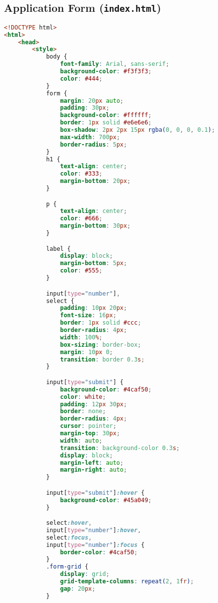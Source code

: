 \subsection{Application Form (\lstinline{index.html})}
\begin{lstlisting}[language=HTML, basicstyle=\footnotesize\ttfamily]
<!DOCTYPE html>
<html>
	<head>
		<style>
			body {
				font-family: Arial, sans-serif;
				background-color: #f3f3f3;
				color: #444;
			}
			form {
				margin: 20px auto;
				padding: 30px;
				background-color: #ffffff;
				border: 1px solid #e6e6e6;
				box-shadow: 2px 2px 15px rgba(0, 0, 0, 0.1);
				max-width: 700px;
				border-radius: 5px;
			}
			h1 {
				text-align: center;
				color: #333;
				margin-bottom: 20px;
			}

			p {
				text-align: center;
				color: #666;
				margin-bottom: 30px;
			}

			label {
				display: block;
				margin-bottom: 5px;
				color: #555;
			}

			input[type="number"],
			select {
				padding: 10px 20px;
				font-size: 16px;
				border: 1px solid #ccc;
				border-radius: 4px;
				width: 100%;
				box-sizing: border-box;
				margin: 10px 0;
				transition: border 0.3s;
			}

			input[type="submit"] {
				background-color: #4caf50;
				color: white;
				padding: 12px 30px;
				border: none;
				border-radius: 4px;
				cursor: pointer;
				margin-top: 30px;
				width: auto;
				transition: background-color 0.3s;
				display: block;
				margin-left: auto;
				margin-right: auto;
			}

			input[type="submit"]:hover {
				background-color: #45a049;
			}

			select:hover,
			input[type="number"]:hover,
			select:focus,
			input[type="number"]:focus {
				border-color: #4caf50;
			}
			.form-grid {
				display: grid;
				grid-template-columns: repeat(2, 1fr);
				gap: 20px;
			}


\end{lstlisting}
